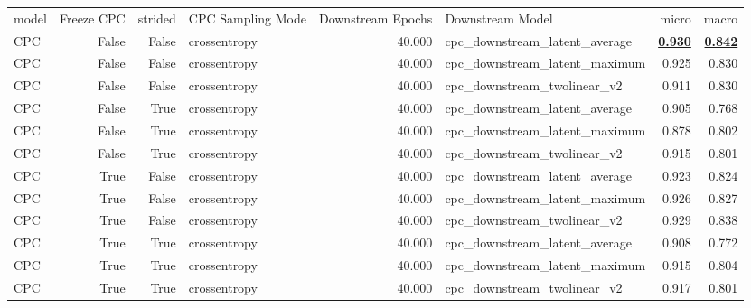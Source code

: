 \begin{adjustbox}{width=\textwidth}
\begin{tabular}{lrrlrlrr}
{model} & {Freeze CPC} & {strided} & {CPC Sampling Mode} & {Downstream Epochs} & {Downstream Model} & {micro} & {macro} \\
CPC & False & False & crossentropy & 40.000 & cpc\_downstream\_latent\_average & \bfseries \underline{0.930} & \bfseries \underline{0.842} \\
CPC & False & False & crossentropy & 40.000 & cpc\_downstream\_latent\_maximum & 0.925 & 0.830 \\
CPC & False & False & crossentropy & 40.000 & cpc\_downstream\_twolinear\_v2 & 0.911 & 0.830 \\
CPC & False & True & crossentropy & 40.000 & cpc\_downstream\_latent\_average & 0.905 & 0.768 \\
CPC & False & True & crossentropy & 40.000 & cpc\_downstream\_latent\_maximum & 0.878 & 0.802 \\
CPC & False & True & crossentropy & 40.000 & cpc\_downstream\_twolinear\_v2 & 0.915 & 0.801 \\
CPC & True & False & crossentropy & 40.000 & cpc\_downstream\_latent\_average & 0.923 & 0.824 \\
CPC & True & False & crossentropy & 40.000 & cpc\_downstream\_latent\_maximum & 0.926 & 0.827 \\
CPC & True & False & crossentropy & 40.000 & cpc\_downstream\_twolinear\_v2 & 0.929 & 0.838 \\
CPC & True & True & crossentropy & 40.000 & cpc\_downstream\_latent\_average & 0.908 & 0.772 \\
CPC & True & True & crossentropy & 40.000 & cpc\_downstream\_latent\_maximum & 0.915 & 0.804 \\
CPC & True & True & crossentropy & 40.000 & cpc\_downstream\_twolinear\_v2 & 0.917 & 0.801 \\
\end{tabular}
\end{adjustbox}